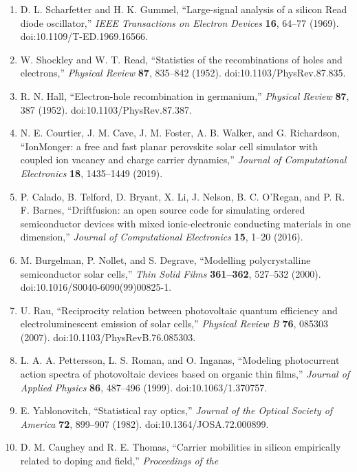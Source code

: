\documentclass[
  11pt,
  american,
]{report}
\providecommand{\tightlist}{%
  \setlength{\itemsep}{0pt}\setlength{\parskip}{0pt}}
\begin{document}
\begin{enumerate}
\def\labelenumi{\arabic{enumi}.}
\tightlist
\item
  D. L. Scharfetter and H. K. Gummel, ``Large-signal analysis of a
  silicon Read diode oscillator,'' \emph{IEEE Transactions on Electron
  Devices} \textbf{16}, 64--77 (1969). doi:10.1109/T-ED.1969.16566.
\item
  W. Shockley and W. T. Read, ``Statistics of the recombinations of
  holes and electrons,'' \emph{Physical Review} \textbf{87}, 835--842
  (1952). doi:10.1103/PhysRev.87.835.
\item
  R. N. Hall, ``Electron-hole recombination in germanium,''
  \emph{Physical Review} \textbf{87}, 387 (1952).
  doi:10.1103/PhysRev.87.387.
\item
  N. E. Courtier, J. M. Cave, J. M. Foster, A. B. Walker, and G.
  Richardson, ``IonMonger: a free and fast planar perovskite solar cell
  simulator with coupled ion vacancy and charge carrier dynamics,''
  \emph{Journal of Computational Electronics} \textbf{18}, 1435--1449
  (2019).
\item
  P. Calado, B. Telford, D. Bryant, X. Li, J. Nelson, B. C. O'Regan, and
  P. R. F. Barnes, ``Driftfusion: an open source code for simulating
  ordered semiconductor devices with mixed ionic-electronic conducting
  materials in one dimension,'' \emph{Journal of Computational
  Electronics} \textbf{15}, 1--20 (2016).
\item
  M. Burgelman, P. Nollet, and S. Degrave, ``Modelling polycrystalline
  semiconductor solar cells,'' \emph{Thin Solid Films}
  \textbf{361--362}, 527--532 (2000). doi:10.1016/S0040-6090(99)00825-1.
\item
  U. Rau, ``Reciprocity relation between photovoltaic quantum efficiency
  and electroluminescent emission of solar cells,'' \emph{Physical
  Review B} \textbf{76}, 085303 (2007). doi:10.1103/PhysRevB.76.085303.
\item
  L. A. A. Pettersson, L. S. Roman, and O. Inganas, ``Modeling
  photocurrent action spectra of photovoltaic devices based on organic
  thin films,'' \emph{Journal of Applied Physics} \textbf{86}, 487--496
  (1999). doi:10.1063/1.370757.
\item
  E. Yablonovitch, ``Statistical ray optics,'' \emph{Journal of the
  Optical Society of America} \textbf{72}, 899--907 (1982).
  doi:10.1364/JOSA.72.000899.
\item
  D. M. Caughey and R. E. Thomas, ``Carrier mobilities in silicon
  empirically related to doping and field,'' \emph{Proceedings of the
}
\end{enumerate}
\end{document}
